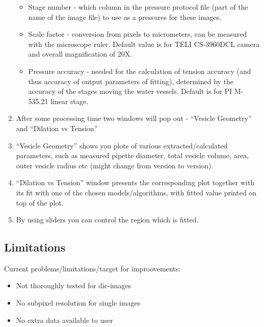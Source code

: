 \begin{enumerate}
\begin{itemize}
		\item Stage number - which column in the pressure protocol file (part of the name of the image file) to use as a pressures for these images.
		\item Scale factor - conversion from pixels to micrometers, can be measured with the microscope ruler. Default value is for TELI CS-3960DCL camera and overall magnification of 20X.
		\item Pressure accuracy - needed for the calculation of tension accuracy (and thus accuracy of output parameters of fitting), determined by the accuracy of the stages moving the water vessels. Default is for PI M-535.21 linear stage.
	\end{itemize}
	\item After some processing time two windows will pop out - ``Vesicle Geometry'' and ``Dilation vs Tension''
	\item ``Vesicle Geometry'' shows you plots of various extracted/calculated parameters, such as measured pipette diameter, total vesicle volume, area, outer vesicle radius etc (might change from version to version).
	\item ``Dilation vs Tension'' window presents the corresponding plot together with its fit with one of the chosen models/algorithms, with fitted value printed on top of the plot.
	\item By using sliders you can control the region which is fitted.
\end{enumerate}

\subsection{Limitations}\label{vampy-limits}
Current problems/limitations/target for improovements:
\begin{itemize}
	\item Not thoroughly tested for dic-images
	\item No subpixel resolution for single images
	\item No extra data available to user
\end{itemize}